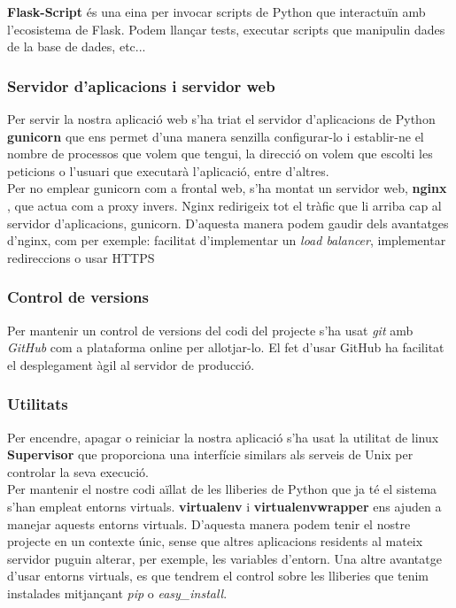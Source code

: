 	\textbf{Flask-Script} \cite{flask_script} és una eina per invocar scripts de Python que interactuïn amb l'ecosistema de Flask. Podem llançar tests, executar scripts que manipulin dades de la base de dades, etc...\\
	

	\subsubsection{Servidor d'aplicacions i servidor web}
	
	Per servir la nostra aplicació web s'ha triat el servidor d'aplicacions de Python \textbf{gunicorn} \cite{gunicorn} que ens permet d'una manera senzilla configurar-lo i establir-ne el nombre de processos que volem que tengui, la direcció on volem que escolti les peticions o l'usuari que executarà l'aplicació, entre d'altres.\\

	Per no emplear gunicorn com a frontal web, s'ha montat un servidor web, \textbf{nginx} \cite{nginx}, que actua com a proxy invers. Nginx redirigeix tot el tràfic que li arriba cap al servidor d'aplicacions, gunicorn. D'aquesta manera podem gaudir dels avantatges d'nginx, com per exemple: facilitat d'implementar un \emph{load balancer}, implementar redireccions o usar \ac{HTTPS}

	\subsubsection{Control de versions}
	Per mantenir un control de versions del codi del projecte s'ha usat \emph{git} \cite{git} amb \emph{GitHub} \cite{github} com a plataforma online per allotjar-lo. El fet d'usar GitHub ha facilitat el desplegament àgil al servidor de producció.
	

	\subsubsection{Utilitats}

	Per encendre, apagar o reiniciar la nostra aplicació s'ha usat la utilitat de linux \textbf{Supervisor} \cite{supervisor} que proporciona una interfície similars als serveis de Unix per controlar la seva execució. \\

	Per mantenir el nostre codi aïllat de les lliberies de Python que ja té el sistema s'han empleat entorns virtuals. \textbf{virtualenv} \cite{virtualenv} i \textbf{virtualenvwrapper} \cite{virtualenvwrapper} ens ajuden a manejar aquests entorns virtuals. D'aquesta manera podem tenir el nostre projecte en un contexte únic, sense que altres aplicacions residents al mateix servidor puguin alterar, per exemple, les variables d'entorn. Una altre avantatge d'usar entorns virtuals, es que tendrem el control sobre les lliberies que tenim instalades mitjançant \emph{pip} o \emph{easy\_install}.\\

